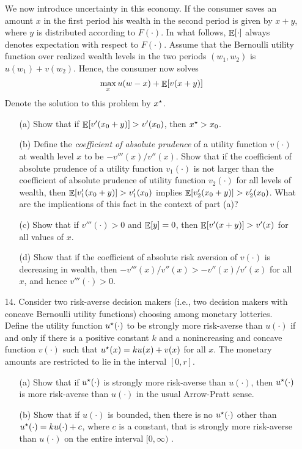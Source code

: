 \documentclass[12pt]{article}
\begin{document}
\begin{itemize}
	We now introduce uncertainty in this economy. If the consumer saves an amount $x$ in the first period his wealth in the second period is given by $x + y$, where $y$ is distributed according to $F(\cdot)$. In what follows, $\mathop{\mathbb{E}}[\cdot]$ always denotes expectation with respect to $F(\cdot)$. Assume that the Bernoulli utility function over realized wealth levels in the two periods $(w_1,w_2)$ is $u(w_1) + v(w_2)$. Hence, the consumer now solves
	\[
	\max_x u(w-x) + \mathop{\mathbb{E}}[v(x+y)]
	\]
	Denote the solution to this problem by $x^\star$.
	\begin{itemize}
		\item[(a)] Show that if $\mathop{\mathbb{E}}[v'(x_0+y)] > v'(x_0)$, then $x^\star > x_0$.
		\item[(b)] Define the \emph{coefficient of absolute prudence} of a utility function $v(\cdot)$ at wealth level $x$ to be $-v'''(x) / v''(x)$. Show that if the coefficient of absolute prudence of a utility function $v_1(\cdot)$ is not larger than the coefficient of absolute prudence of utility function $v_2(\cdot)$ for all levels of wealth, then $\mathop{\mathbb{E}}[v_1'(x_0 + y)] > v_1'(x_0)$ implies $\mathop{\mathbb{E}}[v_2'(x_0 + y)] > v_2'(x_0)$. What are the implications of this fact in the context of part (a)?
		\item[(c)] Show that if $v'''(\cdot) > 0$ and $\mathop{\mathbb{E}}[y] = 0$, then $\mathop{\mathbb{E}}[v'(x+y)] > v'(x)$ for all values of $x$.
		\item[(d)] Show that if the coefficient of absolute risk aversion of $v(\cdot)$ is decreasing in wealth, then $-v'''(x) / v''(x) > -v''(x) / v'(x)$ for all $x$, and hence $v'''(\cdot) > 0$.
	\end{itemize}
	\item[14.] Consider two risk-averse decision makers (i.e., two decision makers with concave Bernoulli utility functions) choosing among monetary lotteries. Define the utility function $u^\star(\cdot)$ to be strongly more risk-averse than $u(\cdot)$ if and only if there is a positive constant $k$ and a nonincreasing and concave function $v(\cdot)$ such that $u^\star(x) = ku(x) + v(x)$ for all $x$. The monetary amounts are restricted to lie in the interval $[0,r]$.
	\begin{itemize}
		\item[(a)] Show that if $u^\star(\cdot)$ is strongly more risk-averse than $u(\cdot)$, then $u^\star(\cdot)$ is more risk-averse than $u(\cdot)$ in the usual Arrow-Pratt sense.
		\item[(b)] Show that if $u(\cdot)$ is bounded, then there is no $u^\star(\cdot)$ other than $u^\star(\cdot) = ku(\cdot) + c$, where $c$ is a constant, that is strongly more risk-averse than $u(\cdot)$ on the entire interval $[0,\infty)$ . 

\end{itemize}
\end{itemize}
\end{document}
